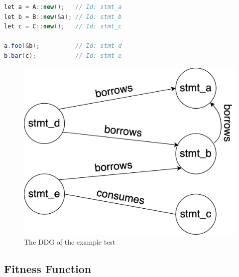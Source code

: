 \documentclass{article}
\begin{document}
\begin{minipage}{0.45\textwidth}
\begin{lstlisting}[language=Java, caption=An example test, label=lst:example-test]
let a = A::new();   // Id: stmt_a
let b = B::new(&a); // Id: stmt_b
let c = C::new();   // Id: stmt_c

a.foo(&b);          // Id: stmt_d
b.bar(c);           // Id: stmt_e
\end{lstlisting}
\end{minipage}%
\hfill
\begin{minipage}{0.45\textwidth}
\begin{figure}[H]
  \caption{The DDG of the example test}

  \includegraphics[width=\linewidth]{ddg-expose}
\end{figure}
\end{minipage}%

\subsection{Fitness Function}
\end{document}

